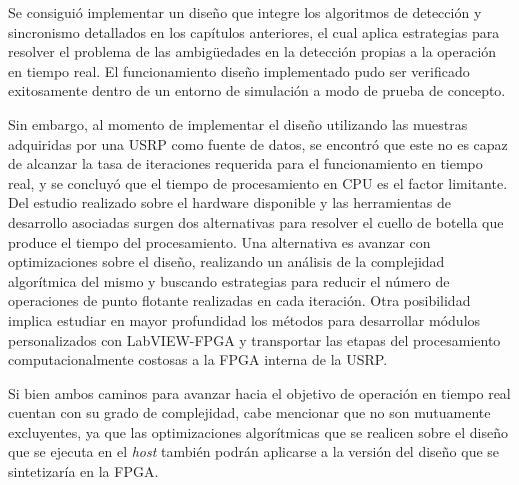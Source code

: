 Se consiguió implementar un diseño que integre los algoritmos de detección y sincronismo detallados en los capítulos anteriores, el cual aplica estrategias para resolver el problema de las ambigüedades en la detección propias a la operación en tiempo real. El funcionamiento diseño implementado pudo ser verificado exitosamente dentro de un entorno de simulación a modo de prueba de concepto.

Sin embargo, al momento de implementar el diseño utilizando las muestras adquiridas por una USRP como fuente de datos, se encontró que este no es capaz de alcanzar la tasa de iteraciones requerida para el funcionamiento en tiempo real, y se concluyó que el tiempo de procesamiento en CPU es el factor limitante. Del estudio realizado sobre el hardware disponible y las herramientas de desarrollo asociadas surgen dos alternativas para resolver el cuello de botella que produce el tiempo del procesamiento. Una alternativa es avanzar con optimizaciones sobre el diseño, realizando un análisis de la complejidad algorítmica del mismo y buscando estrategias para reducir el número de operaciones de punto flotante realizadas en cada iteración. Otra posibilidad implica estudiar en mayor profundidad los métodos para desarrollar módulos personalizados con LabVIEW-FPGA y transportar las etapas del procesamiento computacionalmente costosas a la FPGA interna de la USRP. 

Si bien ambos caminos para avanzar hacia el objetivo de operación en tiempo real cuentan con su grado de complejidad, cabe mencionar que no son mutuamente excluyentes, ya que las optimizaciones algorítmicas que se realicen sobre el diseño que se ejecuta en el \textit{host} también podrán aplicarse a la versión del diseño que se sintetizaría en la FPGA. 





